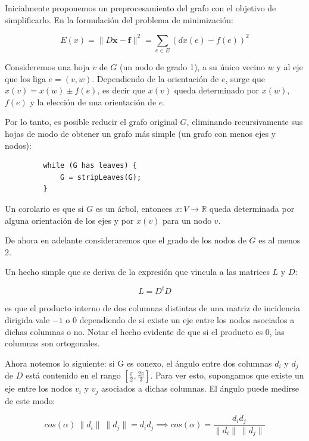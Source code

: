 \documentclass[conference,compsoc,a4paper]{IEEEtran}
\begin{document}
Inicialmente proponemos un preprocesamiento del grafo con el objetivo de 
simplificarlo. En la formulación del problema de minimización:

$$E(x) = \|D\bm{x}-\bm{f}\|^2 = \sum_{e \in E} (dx(e) - f(e))^2$$

Consideremos una hoja $v$ de $G$ (un nodo de grado 1), a su único 
vecino $w$ y al eje que los liga $e=(v,w)$. Dependiendo de la 
orientación de $e$, surge que $x(v) = x(w) \pm 
f(e)$, es decir que $x(v)$ queda determinado por $x(w)$, $f(e)$ y la 
elección de una orientación de $e$.

\smallskip

Por lo tanto, es posible reducir el grafo original $G$, eliminando 
recursivamente sus  hojas de modo de obtener un grafo más simple (un 
grafo con menos ejes y nodos):

\begin{verbatim}
         while (G has leaves) {
             G = stripLeaves(G);
         }
\end{verbatim}

Un corolario es que si $G$ es un árbol, entonces $x: V 
\rightarrow \mathbb{R}$ queda determinada por alguna orientación de 
los ejes y por $x(v)$ para un nodo $v$.

\smallskip

De ahora en adelante consideraremos que el grado de los nodos de $G$ es 
al menos 2.
 
\bigskip


Un hecho simple que se deriva de la expresión que vincula a las matrices 
$L$ y $D$:

$$L = D^t D$$

es que el producto interno de dos columnas distintas de una matriz de 
incidencia dirigida vale $-1$ o $0$ dependiendo de si existe un eje 
entre los nodos asociados a dichas columnas o no. Notar el hecho 
evidente de que si el producto es $0$, las columnas son
 ortogonales.

\smallskip

Ahora notemos lo siguiente: si G es conexo, el ángulo entre dos 
columnas $d_i$ y $d_j$ de $D$ está contenido en el rango 
$[\frac{\pi}{2},\frac{2\pi}{3}]$. Para ver esto, supongamos que existe 
un eje entre los nodos $v_i$ y $v_j$ asociados a dichas columnas. 
El ángulo puede medirse de este modo:

$$cos(\alpha) \ \|d_i\| \ \|d_j\|= d_i  d_j \implies cos(\alpha) = 
\frac{d_i d_j}{\|d_i\| \ \|d_j\|}$$
\end{document}
